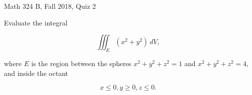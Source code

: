 \documentclass{exam}
\begin{document}
 
\begin{center} \begin{Large} Math 324 B, Fall 2018, Quiz 2\end{Large}
\end{center} 

\vspace{5mm}

\begin{center}
\end{center}

\vspace{1cm}
 

\vspace{1cm}

\begin{questions}
\question Evaluate the integral 

\[
\iiint_E (x^2 + y^2) \, dV,
\]

where $E$ is the region between the spheres $x^2 + y^2 + z^2 = 1$ and $x^2 + y^2 + z^2 = 4$, and inside the octant

\[
x \leq 0, y \geq 0, z \leq 0.
\]


\end{questions}
\end{document}
